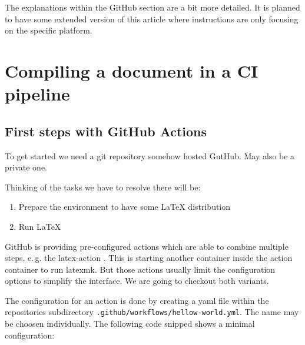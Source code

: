 \documentclass[final]{ltugboat}
\newcommand*{\file}[1]{\texttt{#1}}
\begin{document}
The explanations within the GitHub section are a bit more detailed.
It is planned to have some extended version of this article where instructions are only focusing on the specific platform.

\section{Compiling a document in a CI pipeline}

\subsection{First steps with GitHub Actions}

To get started we need a git repository somehow hosted GutHub.
May also be a private one.

Thinking of the tasks we have to resolve there will be:

\begin{enumerate}
\item Prepare the environment to have some \LaTeX{} distribution
\item Run \LaTeX{}
\end{enumerate}
%
\noindent GitHub is providing pre-configured actions which are able to combine multiple steps, e.\,g. the latex-action \cite{latex-action}.
This  is starting another container inside the action container to run latexmk.
But those actions usually limit the configuration options to simplify the interface.
We are going to checkout both variants.

The configuration for an action is done by creating a yaml file within the repositories subdirectory \file{.github/workflows/hellow-world.yml}.
The name may be choosen individually.
The following code snipped shows a minimal configuration:

\inputminted{yaml}{examples/hello-world.yml}
\end{document}
